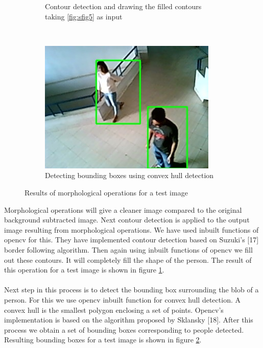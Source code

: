 \documentclass[12pt,a4paper]{report}
\begin{document}
\begin{figure}
\begin{subfigure}{.5\textwidth}
  \caption{Contour detection and drawing the filled contours taking \ref{fig:sfig5} as input}
  \label{fig:sfig6}
\end{subfigure}\\
\centering
\begin{subfigure}{.8\textwidth}
  \centering
  \includegraphics[width=.5\linewidth]{morphology/detections.jpeg}
  \caption{Detecting bounding boxes using convex hull detection}
  \label{fig:sfig7}
\end{subfigure}
\caption{Results of morphological operations for a test image}
\label{fig:fig}
\end{figure}

Morphological operations will give a cleaner image compared to the original background subtracted image. Next contour detection is applied to the output image resulting from morphological operations. We have used inbuilt functions of opencv for this. They have implemented contour detection based on Suzuki's [17] border following algorithm. Then again using inbuilt functions of opencv we fill out these contours. It will completely fill the shape of the person. The result of this operation for a test image is shown in figure \ref{fig:sfig6}.
\\\\
Next step in this process is to detect the bounding box surrounding the blob of a person. For this we use opencv inbuilt function for convex hull detection. A convex hull is the smallest polygon enclosing a set of points. Opencv's implementation is based on the algorithm proposed by Sklansky [18]. After this process we obtain a set of bounding boxes corresponding to people detected. Resulting bounding boxes for a test image is shown in figure \ref{fig:sfig7}.
\end{document}
